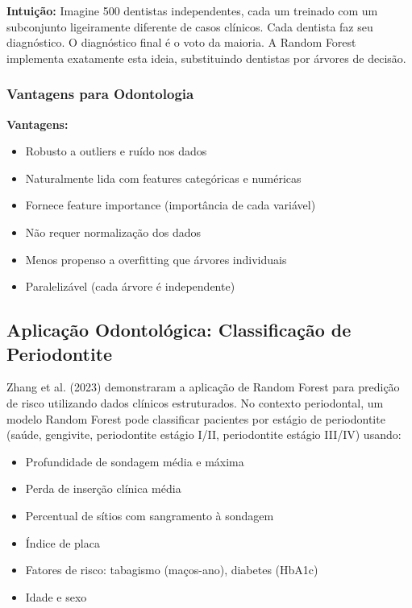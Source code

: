 \textbf{Intuição:} Imagine 500 dentistas independentes, cada um treinado com um subconjunto ligeiramente diferente de casos clínicos. Cada dentista faz seu diagnóstico. O diagnóstico final é o voto da maioria. A Random Forest implementa exatamente esta ideia, substituindo dentistas por árvores de decisão.

\subsubsection{Vantagens para Odontologia}

\textbf{Vantagens:}
\begin{itemize}
    \item Robusto a outliers e ruído nos dados
    \item Naturalmente lida com features categóricas e numéricas
    \item Fornece feature importance (importância de cada variável)
    \item Não requer normalização dos dados
    \item Menos propenso a overfitting que árvores individuais
    \item Paralelizável (cada árvore é independente)
\end{itemize}

\subsection{Aplicação Odontológica: Classificação de Periodontite}

Zhang et al. (2023) \cite{ODT-025} demonstraram a aplicação de Random Forest para predição de risco utilizando dados clínicos estruturados. No contexto periodontal, um modelo Random Forest pode classificar pacientes por estágio de periodontite (saúde, gengivite, periodontite estágio I/II, periodontite estágio III/IV) usando:

\begin{itemize}
    \item Profundidade de sondagem média e máxima
    \item Perda de inserção clínica média
    \item Percentual de sítios com sangramento à sondagem
    \item Índice de placa
    \item Fatores de risco: tabagismo (maços-ano), diabetes (HbA1c)
    \item Idade e sexo
\end{itemize}

